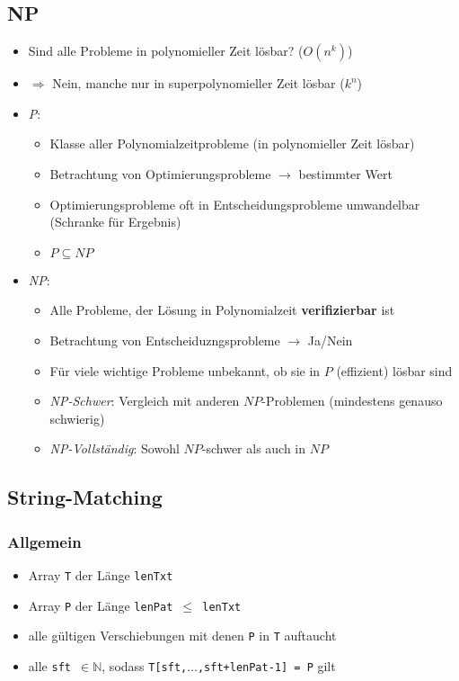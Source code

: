     \subsection{NP}
        \begin{itemize}
            \item Sind alle Probleme in polynomieller Zeit lösbar? ($O(n^k)$)
            \item[] $\Rightarrow$ Nein, manche nur in superpolynomieller Zeit lösbar ($k^n$)
            \item \textit{P}: 
            \begin{itemize}
                \item Klasse aller Polynomialzeitprobleme (in polynomieller Zeit lösbar)
                \item Betrachtung von Optimierungsprobleme $\rightarrow$ bestimmter Wert
                \item Optimierungsprobleme oft in Entscheidungsprobleme umwandelbar (Schranke für Ergebnis)
                \item $P \subseteq NP$
            \end{itemize} 
            \item \textit{NP}: 
                \begin{itemize}
                    \item Alle Probleme, der Lösung in Polynomialzeit \textbf{verifizierbar} ist
                    \item Betrachtung von Entscheiduzngsprobleme $\rightarrow$ Ja/Nein
                    \item Für viele wichtige Probleme unbekannt, ob sie in $P$ (effizient) lösbar sind
                    \item \textit{NP-Schwer}: Vergleich mit anderen $NP$-Problemen (mindestens genauso schwierig)
                    \item \textit{NP-Vollständig}: Sowohl $NP$-schwer als auch in $NP$
                \end{itemize}
        \end{itemize}
\pagebreak
    \subsection{String-Matching}
        \subsubsection{Allgemein}
            \begin{itemize}
                \item {}  Array \texttt{T} der Länge \texttt{lenTxt}
                \item {}  Array \texttt{P} der Länge \texttt{lenPat $\leq$ lenTxt}
                \item {}  alle gültigen Verschiebungen mit denen \texttt{P} in \texttt{T} auftaucht
                \item {} alle \texttt{sft $\in \mathbb{N}$}, sodass \texttt{T[sft,$\dots$,sft+lenPat-1] = P} gilt
            \end{itemize}

